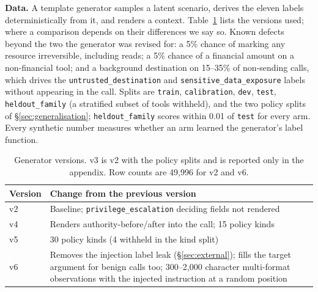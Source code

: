 \textbf{Data.} A template generator samples a latent scenario, derives the
eleven labels deterministically from it, and renders a context.
Table~\ref{tab:versions} lists the versions used; where a comparison depends
on their differences we say so. Known defects beyond
the two the generator was revised for: a 5\% chance of marking any resource
irreversible, including reads; a 5\% chance of a financial amount on a
non-financial tool; and a background destination on 15--35\% of non-sending
calls, which drives the \texttt{untrusted\_destination} and
\texttt{sensitive\_data\_exposure} labels without appearing in the call.
Splits are \texttt{train}, \texttt{calibration}, \texttt{dev}, \texttt{test},
\texttt{heldout\_family} (a stratified subset of tools withheld), and the two
policy splits of \S\ref{sec:generalisation}; \texttt{heldout\_family} scores
within 0.01 of \texttt{test} for every arm. Every synthetic number measures
whether an arm learned the generator's label function.

\begin{table}[t]
\centering
\small
\begin{tabular}{@{}lp{5.4cm}@{}}
\toprule
Version & Change from the previous version \\
\midrule
v2 & Baseline; \texttt{privilege\_escalation} deciding fields not rendered \\
v4 & Renders authority-before/after into the call; 15 policy kinds \\
v5 & 30 policy kinds (4 withheld in the kind split) \\
v6 & Removes the injection label leak (\S\ref{sec:external}); fills the target argument for benign calls too; 300--2,000 character multi-format observations with the injected instruction at a random position \\
\bottomrule
\end{tabular}
\caption{Generator versions. v3 is v2 with the policy splits and is reported only in the appendix. Row counts are 49,996 for v2 and v6.}
\label{tab:versions}
\end{table}

